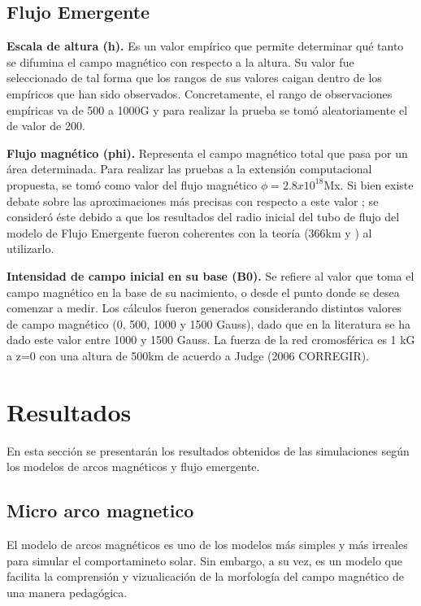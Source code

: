 \documentclass[9pt]{book}
\begin{document}
\subsection{Flujo Emergente}

\textbf{Escala de altura (h). }Es un valor emp\'irico que permite determinar qu\'e tanto se difumina el campo magn\'etico con respecto a la altura. Su valor fue seleccionado de tal forma que los rangos de sus valores caigan dentro de los emp\'iricos que han sido observados. Concretamente, el rango de observaciones emp\'iricas va de 500 a 1000G \cite{VAULT} y para realizar la prueba se tom\'o aleatoriamente el de valor de 200.

\textbf{Flujo magn\'etico (phi). }Representa el campo magn\'etico total que pasa por un \'area determinada. Para realizar las pruebas a la extensi\'on computacional propuesta, se tom\'o como valor del flujo magn\'etico $\phi=2.8x10^{18}$Mx. Si bien existe debate sobre las aproximaciones m\'as precisas con respecto a este valor \cite{magneticflux}; se consider\'o \'este debido a que los resultados del radio inicial del tubo de flujo del modelo de Flujo Emergente fueron coherentes con la teor\'ia (366km \cite{magneticflux} y \cite{VAULT}) al utilizarlo.

\textbf{Intensidad de campo inicial en su base (B0). }Se refiere al valor que toma el campo magn\'etico en la base de su nacimiento, o desde el punto donde se desea comenzar a medir. Los c\'alculos fueron generados considerando distintos valores de campo magn\'etico (0, 500, 1000 y 1500 Gauss), dado que en la literatura se ha dado este valor entre 1000 y 1500 Gauss. La fuerza de la red cromosf\'erica es 1 kG a z=0 con una altura de 500km de acuerdo a Judge (2006 CORREGIR).

\clearpage
\section{Resultados}

En esta secci\'on se presentar\'an los resultados obtenidos de las simulaciones seg\'un los modelos de arcos magn\'eticos y flujo emergente.

\subsection{Micro arco magnetico}
El modelo de arcos magn\'eticos es uno de los modelos m\'as simples y m\'as irreales para simular el comportamineto solar. Sin embargo, a su vez, es un modelo que facilita la comprensi\'on y vizualicaci\'on de la morfolog\'ia del campo magn\'etico de una manera pedag\'ogica.
\end{document}
